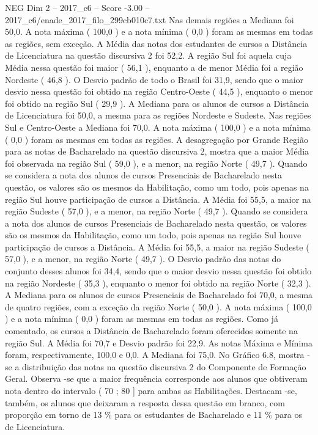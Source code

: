 \begin{textsample}{NEG Dim 2 – 2017\_c6 – Score -3.00 – 2017\_c6/enade\_2017\_filo\_299cb010c7.txt}
Nas demais regiões a Mediana foi 50,0.
A nota máxima ( 100,0 ) e a nota mínima ( 0,0 ) foram as mesmas em todas as regiões, sem exceção.
A Média das notas dos estudantes de cursos a Distância de Licenciatura na questão discursiva 2 foi 52,2.
A região Sul foi aquela cuja Média nessa questão foi maior ( 56,1 ), enquanto a de menor Média foi a região Nordeste ( 46,8 ).
O Desvio padrão de todo o Brasil foi 31,9, sendo que o maior desvio nessa questão foi obtido na região Centro-Oeste ( 44,5 ), enquanto o menor foi obtido na região Sul ( 29,9 ).
A Mediana para os alunos de cursos a Distância de Licenciatura foi 50,0, a mesma para as regiões Nordeste e Sudeste.
Nas regiões Sul e Centro-Oeste a Mediana foi 70,0.
A nota máxima ( 100,0 ) e a nota mínima ( 0,0 ) foram as mesmas em todas as regiões.
A desagregação por Grande Região para as notas de Bacharelado na questão discursiva 2, mostra que a maior Média foi observada na região Sul ( 59,0 ), e a menor, na região Norte ( 49,7 ).
Quando se considera a nota dos alunos de cursos Presenciais de Bacharelado nesta questão, os valores são os mesmos da Habilitação, como um todo, pois apenas na região Sul houve participação de cursos a Distância.
A Média foi 55,5, a maior na região Sudeste ( 57,0 ), e a menor, na região Norte ( 49,7 ).
Quando se considera a nota dos alunos de cursos Presenciais de Bacharelado nesta questão, os valores são os mesmos da Habilitação, como um todo, pois apenas na região Sul houve participação de cursos a Distância.
A Média foi 55,5, a maior na região Sudeste ( 57,0 ), e a menor, na região Norte ( 49,7 ).
O Desvio padrão das notas do conjunto desses alunos foi 34,4, sendo que o maior desvio nessa questão foi obtido na região Nordeste ( 35,3 ), enquanto o menor foi obtido na região Norte ( 32,3 ).
A Mediana para os alunos de cursos Presenciais de Bacharelado foi 70,0, a mesma de quatro regiões, com a exceção da região Norte ( 50,0 ).
A nota máxima ( 100,0 ) e a nota mínima ( 0,0 ) foram as mesmas em todas as regiões.
Como já comentado, os cursos a Distância de Bacharelado foram oferecidos somente na região Sul.
A Média foi 70,7 e Desvio padrão foi 22,9.
As notas Máxima e Mínima foram, respectivamente, 100,0 e 0,0.
A Mediana foi 75,0.
No Gráfico 6.8, mostra -se a distribuição das notas na questão discursiva 2 do Componente de Formação Geral.
Observa -se que a maior frequência corresponde aos alunos que obtiveram nota dentro do intervalo ( 70 ; 80 ] para ambas as Habilitações.
Destacam -se, também, os alunos que deixaram a resposta dessa questão em branco, com proporção em torno de 13 \% para os estudantes de Bacharelado e 11 \% para os de Licenciatura.

\end{textsample}
